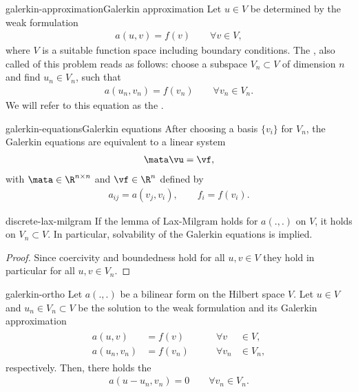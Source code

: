 \begin{Definition*}{galerkin-approximation}{Galerkin approximation}
  Let $u\in V$ be determined by the weak formulation
  \begin{gather*}
    a(u,v) = f(v) \qquad\forall v\in V,
  \end{gather*}
  where $V$ is a suitable function space including boundary
  conditions. The , also called
   of this problem reads as follows:
  choose a subspace $V_n\subset V$ of dimension $n$ and find
  $u_n\in V_n$, such that
  \begin{gather*}
    a(u_n,v_n) = f(v_n) \qquad\forall v_n\in V_n.
  \end{gather*}
  We will refer to this equation as the .
\end{Definition*}

\begin{Corollary*}{galerkin-equations}{Galerkin equations}
  After choosing a basis $\{v_i\}$ for $V_n$, the Galerkin equations are
  equivalent to a linear system
  \begin{gather}
    \mata \vu = \vf,
  \end{gather}
  with $\mata\in\R^{n\times n}$ and $\vf\in \R^n$ defined by
  \begin{gather}
    a_{ij} = a(v_j, v_i), \qquad f_i = f(v_i).
  \end{gather}
\end{Corollary*}

\begin{Lemma}{discrete-lax-milgram}
  If the lemma of Lax-Milgram holds for $a(.,.)$ on $V$, it holds on
  $V_n\subset V$. In particular, solvability of the Galerkin equations
  is implied.
\end{Lemma}

\begin{proof}
  Since coercivity and boundedness hold for all $u,v\in V$ they hold
  in particular for all $u,v\in V_n$.
\end{proof}

\begin{Lemma}{galerkin-ortho}
  Let $a(.,.)$ be a bilinear form on the Hilbert
  space $V$.
  Let $u \in V$ and $u_n\in V_n \subset V$ be the solution to the
  weak formulation and its Galerkin approximation
  \begin{gather*}
    \begin{aligned}
      a(u,v) &= f(v) & \qquad\forall v&\in V,\\
      a(u_n,v_n) &= f(v_n) & \qquad\forall v_n&\in V_n,
    \end{aligned}
  \end{gather*}
  respectively. Then, there holds the 
  \begin{align}
    \label{eq:galerkin-ortho}
    a(u-u_n,v_n) = 0 \qquad \forall v_n\in V_n.
  \end{align}
\end{Lemma}


